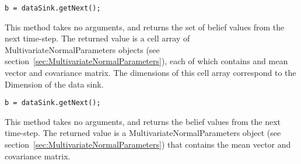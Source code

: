 
\ifmatlab
\begin{lstlisting}
b = dataSink.getNext();
\end{lstlisting}

This method takes no arguments, and returns the set of belief values from the next time-step.  The returned value is a cell array of MultivariateNormalParameters objects (see section~\ref{sec:MultivariateNormalParameters}), each of which contains and mean vector and covariance matrix.  The dimensions of this cell array correspond to the Dimension of the data sink.
\fi

\ifjava
\begin{lstlisting}
b = dataSink.getNext();
\end{lstlisting}

This method takes no arguments, and returns the belief values from the next time-step.  The returned value is a MultivariateNormalParameters object (see section~\ref{sec:MultivariateNormalParameters}) that contains the mean vector and covariance matrix. 
\fi



